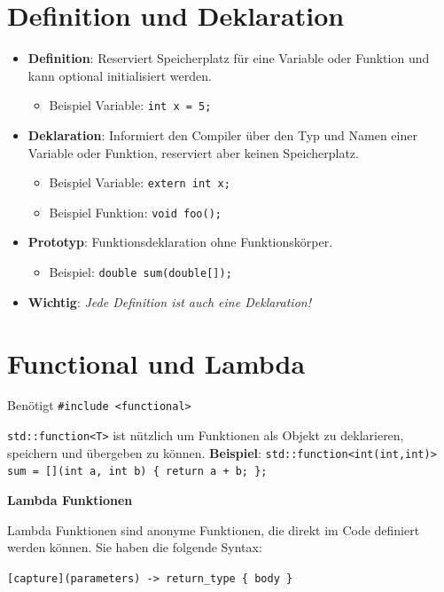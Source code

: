 \documentclass[9pt, landscape]{article}
\newcommand{\algo}[1]{\textbf{\textcolor{blue!60!black}{#1}}}
\newcommand{\datastruct}[1]{\textbf{\textcolor{red!60!black}{#1}}}
\begin{document}
\begin{multicols*}{4}
\section{Definition und Deklaration}
\begin{itemize}
    \item \algo{Definition}: Reserviert Speicherplatz für eine Variable oder Funktion und kann optional initialisiert werden.
    \begin{itemize}
        \item Beispiel Variable: \lstinline|int x = 5;|
    \end{itemize}
    \item \datastruct{Deklaration}: Informiert den Compiler über den Typ und Namen einer Variable oder Funktion, reserviert aber keinen Speicherplatz.
    \begin{itemize}
        \item Beispiel Variable: \lstinline|extern int x;|
        \item Beispiel Funktion: \lstinline|void foo();|
    \end{itemize}
    \item \datastruct{Prototyp}: Funktionsdeklaration ohne Funktionskörper.
    \begin{itemize}
        \item Beispiel: \lstinline|double sum(double[]);|
    \end{itemize}
    \item \algo{Wichtig}: \textit{Jede Definition ist auch eine Deklaration!}
\end{itemize}

\section{Functional und Lambda}

Benötigt \lstinline|#include <functional>|

\lstinline|std::function<T>| ist nützlich um Funktionen als Objekt zu deklarieren, speichern und übergeben zu können. \algo{Beispiel}:
\lstinline|std::function<int(int,int)> sum = [](int a, int b) { return a + b; };|

\datastruct{Lambda Funktionen}

Lambda Funktionen sind anonyme Funktionen, die direkt im Code definiert werden können. Sie haben die folgende Syntax:

\lstinline|[capture](parameters) -> return_type { body }|


\end{multicols*}
\end{document}
